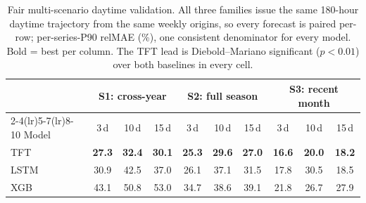 \begin{table}[!t]
\caption{Fair multi-scenario daytime validation. All three families issue the same 180-hour daytime trajectory from the same weekly origins, so every forecast is paired per-row; per-series-P90 relMAE (\%), one consistent denominator for every model. Bold = best per column. The TFT lead is Diebold--Mariano significant ($p<0.01$) over both baselines in every cell.}
\label{tab:a2}
\centering\footnotesize
\begin{tabular}{l ccc ccc ccc}
\toprule
 & \multicolumn{3}{c}{S1: cross-year} & \multicolumn{3}{c}{S2: full season} & \multicolumn{3}{c}{S3: recent month} \\
\cmidrule(lr){2-4}\cmidrule(lr){5-7}\cmidrule(lr){8-10}
Model & 3\,d & 10\,d & 15\,d & 3\,d & 10\,d & 15\,d & 3\,d & 10\,d & 15\,d \\
\midrule
TFT & \textbf{27.3} & \textbf{32.4} & \textbf{30.1} & \textbf{25.3} & \textbf{29.6} & \textbf{27.0} & \textbf{16.6} & \textbf{20.0} & \textbf{18.2} \\
LSTM & 30.9 & 42.5 & 37.0 & 26.1 & 37.1 & 31.5 & 17.8 & 30.5 & 18.5 \\
XGB & 43.1 & 50.8 & 53.0 & 34.7 & 38.6 & 39.1 & 21.8 & 26.7 & 27.9 \\
\bottomrule
\end{tabular}
\end{table}